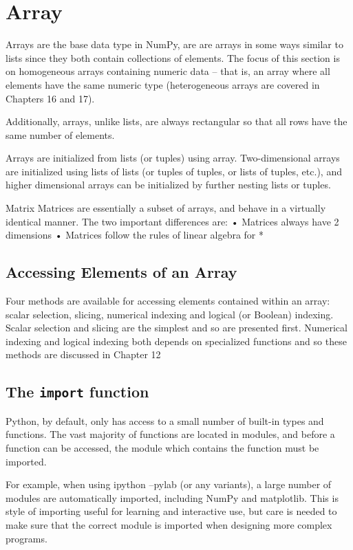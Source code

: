 \section*{Array}
Arrays are the base data type in NumPy, are are arrays in some ways similar to lists since they both contain
collections of elements. The focus of this section is on homogeneous arrays containing numeric data
– that is, an array where all elements have the same numeric type (heterogeneous arrays are covered in
Chapters 16 and 17). 

Additionally, arrays, unlike lists, are always rectangular so that all rows have the same
number of elements.

Arrays are initialized from lists (or tuples) using array. Two-dimensional arrays are initialized using
lists of lists (or tuples of tuples, or lists of tuples, etc.), and higher dimensional arrays can be initialized by
further nesting lists or tuples.

Matrix
Matrices are essentially a subset of arrays, and behave in a virtually identical manner. The two important
differences are:
• Matrices always have 2 dimensions
• Matrices follow the rules of linear algebra for *



\subsection{Accessing Elements of an Array}
Four methods are available for accessing elements contained within an array: scalar selection, slicing,
numerical indexing and logical (or Boolean) indexing. Scalar selection and slicing are the simplest and so
are presented first. Numerical indexing and logical indexing both depends on specialized functions and
so these methods are discussed in Chapter 12

\subsection{The \texttt{import} function}
Python, by default, only has access to a small number of built-in types and functions. The vast majority of
functions are located in modules, and before a function can be accessed, the module which contains the
function must be imported. 

For example, when using ipython --pylab (or any variants), a large number
of modules are automatically imported, including NumPy and matplotlib. This is style of importing useful
for learning and interactive use, but care is needed to make sure that the correct module is imported when
designing more complex programs.

